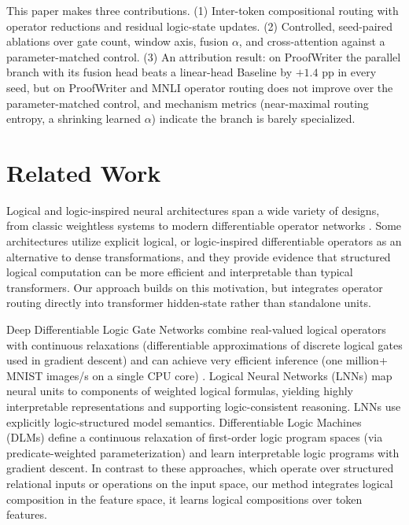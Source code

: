 \documentclass[10pt,twocolumn,letterpaper]{article}
\begin{document}
This paper makes three contributions. (1) Inter-token compositional routing with
operator reductions and residual logic-state updates. (2) Controlled, seed-paired
ablations over gate count, window axis, fusion $\alpha$, and cross-attention
against a parameter-matched control. (3) An attribution result: on ProofWriter
the parallel branch with its fusion head beats a linear-head Baseline by
$+1.4$ pp in every seed, but on ProofWriter and MNLI operator routing does not
improve over the parameter-matched control, and
mechanism metrics (near-maximal routing entropy, a shrinking learned $\alpha$)
indicate the branch is barely specialized.

\section{Related Work}

Logical and logic-inspired neural architectures span a wide variety of designs,
from classic weightless systems to modern differentiable operator networks
\cite{Aleksander2009ABI}.
Some architectures utilize explicit logical, or logic-inspired
differentiable operators \cite{petersen2022deepdifferentiablelogicgate} as an
alternative to dense transformations, and they provide evidence that structured
logical computation can be more efficient and interpretable than typical
transformers. Our approach builds on this motivation, but integrates operator routing
directly into transformer hidden-state rather than standalone units.

Deep Differentiable Logic Gate Networks combine real-valued logical operators
with continuous relaxations (differentiable approximations of discrete
logical gates used in gradient descent) and can achieve very efficient inference
(one million+ MNIST images/s on a single CPU core)
\cite{petersen2022deepdifferentiablelogicgate}.
Logical Neural Networks (LNNs) \cite{riegel2020logicalneuralnetworks}
map neural units to components of weighted logical formulas, yielding highly
interpretable representations and supporting logic-consistent reasoning.
LNNs use explicitly logic-structured model semantics.
Differentiable Logic Machines (DLMs) \cite{zimmer2023differentiablelogicmachines}
define a continuous relaxation of first-order logic program spaces (via
predicate-weighted parameterization) and learn interpretable logic programs
with gradient descent. In contrast to these approaches, which operate over
structured relational inputs or operations on the input space,
our method integrates logical composition in the feature space,
it learns logical compositions over token features.
\end{document}
